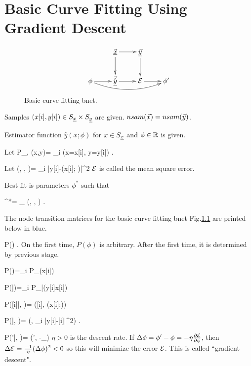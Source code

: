 \chapter{Basic Curve Fitting
Using Gradient Descent}
\label{chap-basic-fit}

\begin{figure}[h!]
\centering
$$\xymatrix{
&\vec{\rvx}\ar[d]\ar[r]&\ul{\vecy}
\ar[d]&\\
\phi\ar[r]\ar@/_1pc/[rrr]&
\vec{\hat{\rvy}}\ar[r]&\cale\ar[r]&\phi'
}$$
\caption{Basic curve fitting bnet.}
\label{fig-bfit}
\end{figure}


Samples 
$(x[i], y[i])\in S_{\underline{x}}\times S_{\underline{y}}$
are given. $nsam({\vec{x}})=nsam({\vec{y}})$.

Estimator function 
$\hat{y}(x; \phi)$
for $x\in S_{\underline{x}}$ and $\phi\in{ \mathbb{R}}$
is given.

Let 
\beq
P_{\rvx, \rvy}(x,y)=
\sum_i (x=x[i], y=y[i])
\;.
\eeq


Let 
\beq
\cale(\vecx, \vecy, \phi)=
\sum_i
|y[i]-(x[i]; \phi)|^2
\;
\eeq
${\cal E}$ is called the mean square error.

Best fit is parameters $\phi^*$
such that

\beq 
\phi^*= _\phi
\cale(\vecx, \vecy, \phi)
\;.
\eeq

The node transition matrices for
the basic curve fitting bnet
 Fig.\ref{fig-bfit} are
printed below in blue.

\beq\color{blue}
P(\phi) 
\;.
\eeq
On the first time, $P(\phi)$ is arbitrary.
After the first time, it is determined 
by previous stage.

\beq\color{blue}
P(\vecx)=\prod_i P_\rvx(x[i])
\eeq

\beq\color{blue}
P(\vecy|\vecx)=\prod_i P_{\rvy|\rvx}(y[i]\cond x[i])
\eeq

\beq\color{blue}
P([i]|\phi, \vecx)=
\delta([i], (x[i];\phi))
\eeq


\beq\color{blue}
P(\cale|, \vecy)=
\delta(\cale,
\sum_i |y[i]-[i]|^2)
\;.
\eeq


\beq\color{blue}
P(\phi'|\phi, \cale)=
\delta(\phi',
\phi-\eta\partial_\phi\cale)
\eeq
$\eta>0$ is the descent rate.
If $\Delta \phi=\phi'-\phi=-\eta 
\frac{\partial{\cal E}}
{\partial \phi}$, then
 $\Delta {\cal E}=\frac{-1}{\eta}
(\Delta\phi)^2<0$  so this will
minimize the error
${\cal E}$.
This is called ``gradient descent".